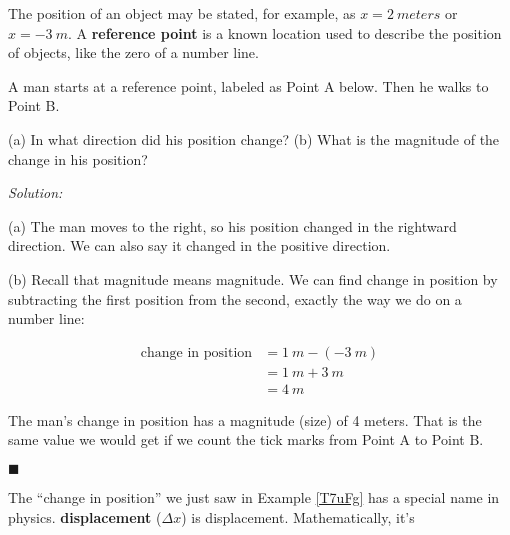 \documentclass[dvipsnames]{article}
\begin{document}
The position of an object may be stated, for example, as $x = \SI{2}{meters}$ or $x = \SI{-3}{m}$. A \textbf{reference point} is a known location used to describe the position of objects, like the zero of a number line.

\begin{example} \label{T7uFg}
A man starts at a reference point, labeled as Point A below. Then he walks to Point B. 

\begin{center}
\end{center}

(a) In what direction did his position change? (b) What is the magnitude of the change in his position?
\end{example}

\textit{Solution:}

(a) The man moves to the right, so his position changed in the rightward direction. We can also say it changed in the positive direction.

(b) Recall that magnitude means \glsdesc{magnitude}. We can find change in position by subtracting the first position from the second, exactly the way we do on a number line:

\vspace{-1em}
\begin{align*}
    \text{change in position} &= \SI{1}{m} - \left(-\SI{3}{m}\right) \\[1ex]
    &= \SI{1}{m} + \SI{3}{m} \\[1ex]
    &= \boxed{\SI{4}{m}}
\end{align*}

The man's change in position has a magnitude (size) of 4 meters. That is the same value we would get if we count the tick marks from Point A to Point B.

\hfill $\blacksquare$

The ``change in position'' we just saw in Example \ref{T7uFg} has a special name in physics. \textbf{\Gls{displacement}} ($\Delta x$) is \glsdesc{displacement}. Mathematically, it's
\end{document}
